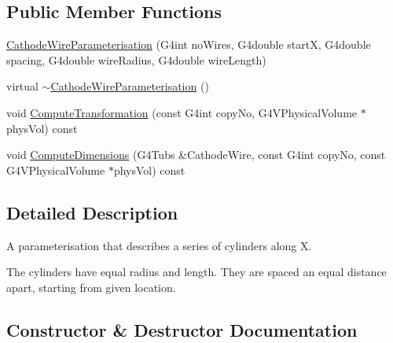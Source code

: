 \subsection*{Public Member Functions}
\begin{DoxyCompactItemize}
\item 
\hyperlink{classCathodeWireParameterisation_abce4015ff180441e0271439f1bb00fd3}{Cathode\+Wire\+Parameterisation} (G4int no\+Wires, G4double startX, G4double spacing, G4double wire\+Radius, G4double wire\+Length)
\item 
virtual \hyperlink{classCathodeWireParameterisation_a91c880083baa1ba10dc2cb9d11a4db53}{$\sim$\+Cathode\+Wire\+Parameterisation} ()
\item 
void \hyperlink{classCathodeWireParameterisation_a99133ca88cbbe015073392341e8ab75f}{Compute\+Transformation} (const G4int copy\+No, G4\+V\+Physical\+Volume $\ast$phys\+Vol) const 
\item 
void \hyperlink{classCathodeWireParameterisation_a48c0259d9eabc4292431be2d677b2922}{Compute\+Dimensions} (G4\+Tubs \&Cathode\+Wire, const G4int copy\+No, const G4\+V\+Physical\+Volume $\ast$phys\+Vol) const 
\end{DoxyCompactItemize}


\subsection{Detailed Description}
A parameterisation that describes a series of cylinders along X.

The cylinders have equal radius and length. They are spaced an equal distance apart, starting from given location. 

\subsection{Constructor \& Destructor Documentation}
